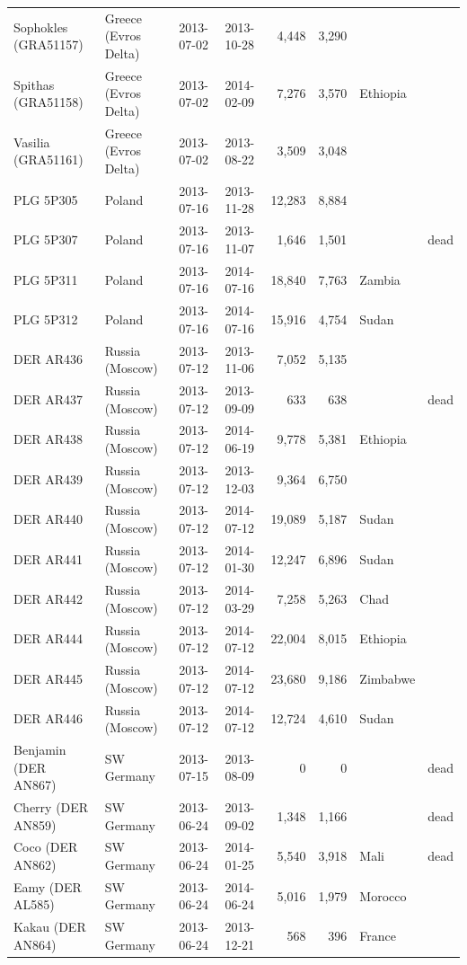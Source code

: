 \documentclass[11pt,a4paper]{article}
\begin{document}
{\begin{longtable}{llllrrll}
Sophokles (GRA51157) & Greece (Evros Delta) & 2013-07-02 & 2013-10-28 & 4,448 & 3,290 &  & \\
Spithas (GRA51158) & Greece (Evros Delta) & 2013-07-02 & 2014-02-09 & 7,276 & 3,570 & Ethiopia & \\
Vasilia (GRA51161) & Greece (Evros Delta) & 2013-07-02 & 2013-08-22 & 3,509 & 3,048 &  & \\
PLG 5P305 & Poland & 2013-07-16 & 2013-11-28 & 12,283 & 8,884 &  & \\
PLG 5P307 & Poland & 2013-07-16 & 2013-11-07 & 1,646 & 1,501 &  & dead\\
PLG 5P311 & Poland & 2013-07-16 & 2014-07-16 & 18,840 & 7,763 & Zambia & \\
PLG 5P312 & Poland & 2013-07-16 & 2014-07-16 & 15,916 & 4,754 & Sudan & \\
DER AR436 & Russia (Moscow) & 2013-07-12 & 2013-11-06 & 7,052 & 5,135 &  & \\
DER AR437 & Russia (Moscow) & 2013-07-12 & 2013-09-09 & 633 & 638 &  & dead\\
DER AR438 & Russia (Moscow) & 2013-07-12 & 2014-06-19 & 9,778 & 5,381 & Ethiopia & \\
DER AR439 & Russia (Moscow) & 2013-07-12 & 2013-12-03 & 9,364 & 6,750 &  & \\
DER AR440 & Russia (Moscow) & 2013-07-12 & 2014-07-12 & 19,089 & 5,187 & Sudan & \\
DER AR441 & Russia (Moscow) & 2013-07-12 & 2014-01-30 & 12,247 & 6,896 & Sudan & \\
DER AR442 & Russia (Moscow) & 2013-07-12 & 2014-03-29 & 7,258 & 5,263 & Chad & \\
DER AR444 & Russia (Moscow) & 2013-07-12 & 2014-07-12 & 22,004 & 8,015 & Ethiopia & \\
DER AR445 & Russia (Moscow) & 2013-07-12 & 2014-07-12 & 23,680 & 9,186 & Zimbabwe & \\
DER AR446 & Russia (Moscow) & 2013-07-12 & 2014-07-12 & 12,724 & 4,610 & Sudan & \\
Benjamin (DER AN867) & SW Germany & 2013-07-15 & 2013-08-09 & 0 & 0 &  & dead\\
Cherry (DER AN859) & SW Germany & 2013-06-24 & 2013-09-02 & 1,348 & 1,166 &  & dead\\
Coco (DER AN862) & SW Germany & 2013-06-24 & 2014-01-25 & 5,540 & 3,918 & Mali & dead\\
Eamy (DER AL585) & SW Germany & 2013-06-24 & 2014-06-24 & 5,016 & 1,979 & Morocco & \\
Kakau (DER AN864) & SW Germany & 2013-06-24 & 2013-12-21 & 568 & 396 & France & \\

\end{longtable}}
\end{document}
